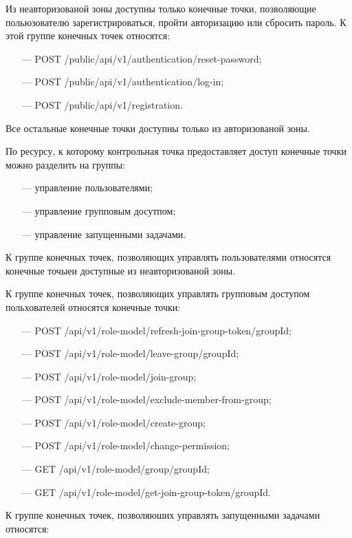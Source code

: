 Из неавторизованой зоны доступны только конечные точки, позволяющие польюзователю зарегистрироваться, пройти авторизацию или сбросить пароль.
К этой группе конечных точек относятся:

\begin{itemize}
  \item[---] POST /public/api/v1/authentication/reset-password;
  \item[---] POST /public/api/v1/authentication/log-in;
  \item[---] POST /public/api/v1/registration.
\end{itemize}

Все остальные конечные точки доступны только из авторизованой зоны.

По ресурсу, к которому контрольная точка предоставляет доступ конечные точки можно разделить на группы:

\begin{itemize}
  \item[---]управление пользователями;
  \item[---]управление групповым досутпом;
  \item[---]управление запущенными задачами.
\end{itemize}

К группе конечных точек, позволяющих управлять пользователями относятся конечные точыеи доступные из неавторизованой зоны.

К группе конечных точек, позволяющих управлять групповым доступом польхователей относятся конечные точки:

\begin{itemize}
  \item[---] POST /api/v1/role-model/refresh-join-group-token/{groupId};
  \item[---] POST /api/v1/role-model/leave-group/{groupId};
  \item[---] POST /api/v1/role-model/join-group;
  \item[---] POST /api/v1/role-model/exclude-member-from-group;
  \item[---] POST /api/v1/role-model/create-group;
  \item[---] POST /api/v1/role-model/change-permission;
  \item[---] GET /api/v1/role-model/group/{groupId};
  \item[---] GET /api/v1/role-model/get-join-group-token/{groupId}.
\end{itemize}

К группе конечных точек, позволяюших управлять запущенными задачами относятся:

